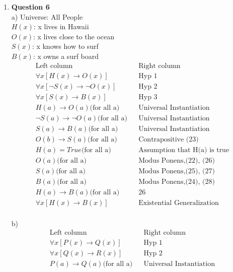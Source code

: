 \documentclass[12pt]{article}
\begin{document}
\begin{enumerate}
\item {\bf{Question 6}} \\
a) Universe: All People \\
$H(x)$: x lives in Hawaii \\
$O(x)$: x lives close to the ocean \\
$S(x)$: x knows how to surf \\
$B(x)$: x owns a surf board \\
\begin{align}
\textrm{Left column} && \textrm{Right column} \\
      \forall x[H(x) \rightarrow O(x)] && \textrm{Hyp 1} \\
  	  \forall x [\lnot S(x) \rightarrow \lnot O(x)] && \textrm{Hyp 2} \\
      \forall x [S(x) \rightarrow B(x)] && \textrm{Hyp 3} \\
      H(a) \rightarrow O(a) \textrm{(for all a)} && \textrm{Universal Instantiation} \\
      \lnot S(a) \rightarrow \lnot O(a) \textrm{(for all a)} && \textrm{Universal Instantiation} \\
      S(a) \rightarrow B(a) \textrm{(for all a)} && \textrm{Universal Instantiation} \\
      O(b) \rightarrow S(a) \textrm{(for all a)} &&  \textrm{Contrapositive (23)} \\
      H(a) = True \textrm{(for all a)} && \textrm{Assumption that H(a) is true} \\ 
      O(a) \textrm{(for all a)} && \textrm{Modus Ponens,(22), (26)} \\
      S(a) \textrm{(for all a)} && \textrm{Modus Ponens,(25), (27)} \\
      B(a) \textrm{(for all a)} && \textrm{Modus Ponens,(24), (28)} \\
      H(a) \rightarrow B(a) \textrm{(for all a)}  && \textrm{26} \\
      \forall x[H(x) \rightarrow B(x)] && \textrm{Existential Generalization} 
\end{align} \\
b) 
\begin{align}
\textrm{Left column} && \textrm{Right column} \\
	  \forall x[P(x) \rightarrow Q(x)] && \textrm{Hyp 1} \\
  	  \forall x [Q(x) \rightarrow R(x)] && \textrm{Hyp 2} \\
      P(a) \rightarrow Q(a) \textrm{(for all a)} && \textrm{Universal Instantiation} \\

\end{align}
\end{enumerate}
\end{document}

